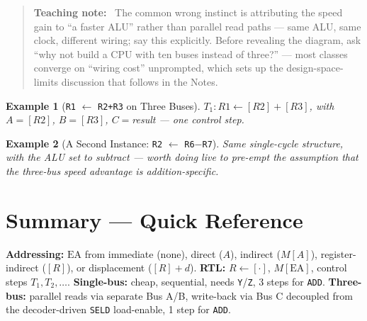 \documentclass[11pt]{article}
\newtheorem{example}{Example}[section]
\newenvironment{teachingaside}{\begin{quote}\small\color{primary-gold}\textbf{Teaching note:}\ }{\end{quote}}
\begin{document}
\begin{teachingaside}
The common wrong instinct is attributing the speed gain to ``a faster ALU'' rather than parallel read paths --- same ALU, same clock, different wiring; say this explicitly. Before revealing the diagram, ask ``why not build a CPU with ten buses instead of three?'' --- most classes converge on ``wiring cost'' unprompted, which sets up the design-space-limits discussion that follows in the Notes.
\end{teachingaside}

\begin{example}[\texttt{R1} $\gets$ \texttt{R2+R3} on Three Buses]
$T_1: R1 \gets [R2]+[R3]$, with $A=[R2]$, $B=[R3]$, $C=$result --- one control step.
\end{example}

\begin{example}[A Second Instance: \texttt{R2} $\gets$ \texttt{R6}$-$\texttt{R7}]
Same single-cycle structure, with the ALU set to subtract --- worth doing live to pre-empt the assumption that the three-bus speed advantage is addition-specific.
\end{example}

\section{Summary --- Quick Reference}

\textbf{Addressing:} $\text{EA}$ from immediate (none), direct ($A$), indirect ($M[A]$), register-indirect ($[R]$), or displacement ($[R]+d$). \textbf{RTL:} $R \gets [\cdot]$, $M[\text{EA}]$, control steps $T_1, T_2, \dots$. \textbf{Single-bus:} cheap, sequential, needs \texttt{Y}/\texttt{Z}, 3 steps for \texttt{ADD}. \textbf{Three-bus:} parallel reads via separate Bus A/B, write-back via Bus C decoupled from the decoder-driven \texttt{SELD} load-enable, 1 step for \texttt{ADD}.
\end{document}
